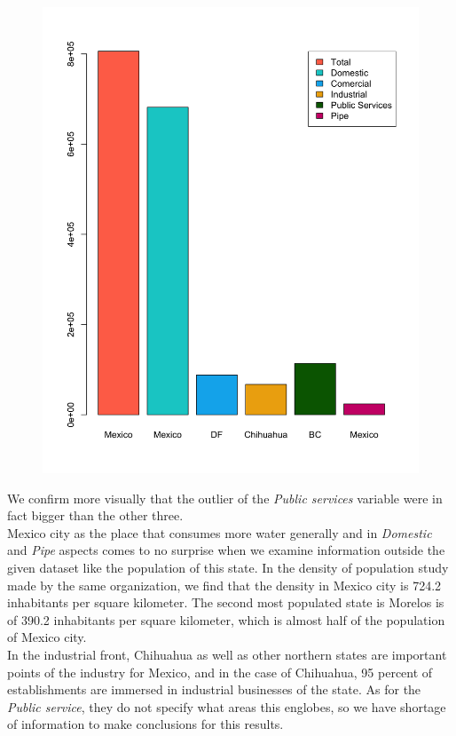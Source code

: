 \documentclass{article}
\begin{document}
\begin{figure}[htp]
	\centering
	\includegraphics[width=\linewidth]{histo.png}
	\caption{}\label{fig3}
\end{figure}

\clearpage
We confirm more visually that the outlier of the \textit{Public services} variable were in fact bigger than the other three.\\

Mexico city as the place that consumes more water generally and in \textit{Domestic} and \textit{Pipe} aspects comes to no surprise when we examine information outside the given dataset like the population of this state. In the density of population study made by the same organization, we find that the density in Mexico city is 724.2 inhabitants per square kilometer. The second most populated state is Morelos is of 390.2 inhabitants per square kilometer, which is almost half of the population of Mexico city\cite{ine2}.\\

In the industrial front, Chihuahua as well as other northern states are important points of the industry for Mexico, and in the case of Chihuahua, 95 percent of establishments are immersed in industrial businesses of the state\cite{industria}. As for the \textit{Public service}, they do not specify what areas this englobes, so we have shortage of information to make conclusions for this results.\\
\end{document}
